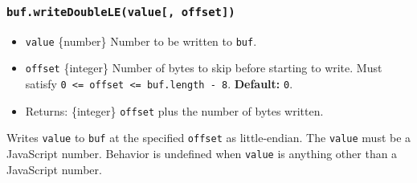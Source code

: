 \begin{Shaded}
\begin{Highlighting}[]
\NormalTok{ \{ }\NormalTok{ \} }\OperatorTok{=} \NormalTok{(}\NormalTok{)}\OperatorTok{;}

\OperatorTok{=} \NormalTok{(}\NormalTok{)}\OperatorTok{;}

\NormalTok{(}\OperatorTok{,} \NormalTok{)}\OperatorTok{;}

\OperatorTok{;}
\end{Highlighting}
\end{Shaded}

\subsubsection{\texorpdfstring{\texttt{buf.writeDoubleLE(value{[},\ offset{]})}}{buf.writeDoubleLE(value{[}, offset{]})}}\label{buf.writedoublelevalue-offset}

\begin{itemize}
\tightlist
\item
  \texttt{value} \{number\} Number to be written to \texttt{buf}.
\item
  \texttt{offset} \{integer\} Number of bytes to skip before starting to
  write. Must satisfy
  \texttt{0\ \textless{}=\ offset\ \textless{}=\ buf.length\ -\ 8}.
  \textbf{Default:} \texttt{0}.
\item
  Returns: \{integer\} \texttt{offset} plus the number of bytes written.
\end{itemize}

Writes \texttt{value} to \texttt{buf} at the specified \texttt{offset}
as little-endian. The \texttt{value} must be a JavaScript number.
Behavior is undefined when \texttt{value} is anything other than a
JavaScript number.

\begin{Shaded}
\begin{Highlighting}[]
\NormalTok{ \{ }\NormalTok{ \} } \OperatorTok{;}

\OperatorTok{=} \NormalTok{(}\NormalTok{)}\OperatorTok{;}

\NormalTok{(}\OperatorTok{,} \NormalTok{)}\OperatorTok{;}

\OperatorTok{;}
\end{Highlighting}
\end{Shaded}

